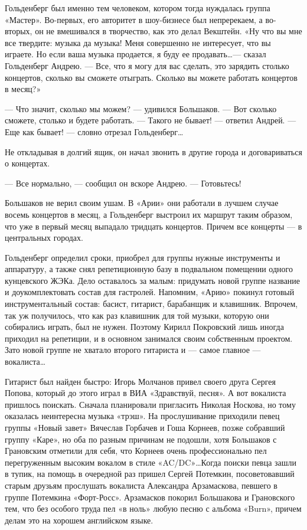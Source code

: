\documentclass[16pt,a5paper]{book}
\begin{document}
Гольденберг был именно тем человеком, котором тогда нуждалась группа «Мастер». Во-первых, его авторитет в шоу-бизнесе
был непререкаем, а во-вторых, он не вмешивался в творчество, как это делал Векштейн. «Ну что вы мне все твердите: музыка
да музыка! Меня совершенно не интересует, что вы играете. Но если ваша музыка продается, я буду ее продавать\ldots —
сказал Гольденберг Андрею. — Все, что я могу для вас сделать, это зарядить столько концертов, сколько вы сможете
отыграть. Сколько вы можете работать концертов в месяц?»

— Что значит, сколько мы можем? — удивился Большаков.
— Вот сколько сможете, столько и будете работать.
— Такого не бывает! — ответил Андрей.
— Еще как бывает! — словно отрезал Гольденберг\ldots

Не откладывая в долгий ящик, он начал звонить в другие города и договариваться о концертах.

— Все нормально, — сообщил он вскоре Андрею. — Готовьтесь!

Большаков не верил своим ушам. В «Арии» они работали в лучшем случае восемь концертов в месяц, а Гольденберг выстроил их
маршрут таким образом, что уже в первый месяц выпадало тридцать концертов. Причем все концерты — в центральных городах.

Гольденберг определил сроки, приобрел для группы нужные инструменты и аппаратуру, а также снял репетиционную базу в
подвальном помещении одного кунцевского ЖЭКа. Дело оставалось за малым: придумать новой группе название и
доукомплектовать состав для гастролей. Напомним, «Арию» покинул готовый инструментальный состав: басист, гитарист,
барабанщик и клавишник. Впрочем, так уж получилось, что как раз клавишник для той музыки, которую они собирались играть,
был не нужен. Поэтому Кирилл Покровский лишь иногда приходил на репетиции, и в основном занимался своим собственным
проектом. Зато новой группе не хватало второго гитариста и — самое главное — вокалиста\ldots

Гитарист был найден быстро: Игорь Молчанов привел своего друга Сергея Попова, который до этого играл в ВИА «Здравствуй,
песня». А вот вокалиста пришлось поискать. Сначала планировали пригласить Николая Носкова, но тому оказалась неинтересна
музыка «трэш». На прослушивание приходили певец группы «Новый завет» Вячеслав Горбачев и Гоша Корнеев, позже собравший
группу «Каре», но оба по разным причинам не подошли, хотя Большаков с Грановским отметили для себя, что Корнеев очень
профессионально пел перегруженным высоким вокалом в стиле «AC/DC»\ldots Когда поиски певца зашли в тупик, на помощь в
очередной раз пришел Сергей Потемкин, посоветовавший старым друзьям прослушать вокалиста Александра Арзамаскова, певшего
в группе Потемкина «Форт-Росс». Арзамасков покорил Большакова и Грановского тем, что без особого труда пел «в ноль»
любую песню с альбома «Burn», причем делам это на хорошем английском языке.
\end{document}
